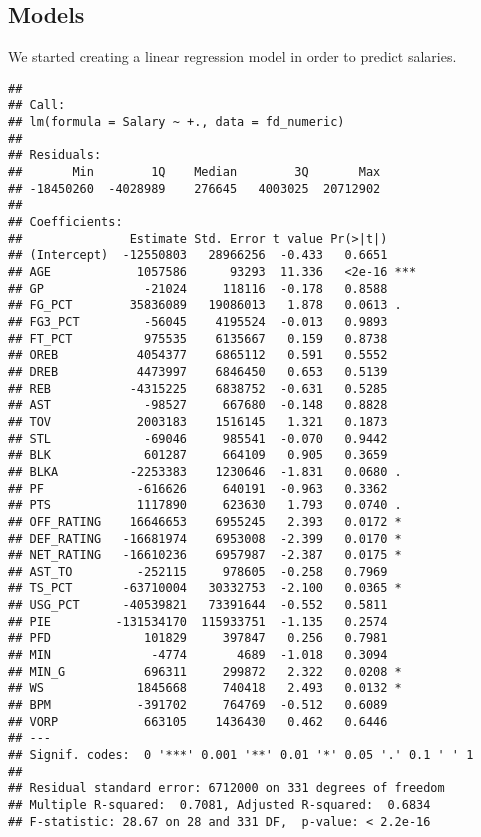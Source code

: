 \documentclass[
]{article}
\begin{document}
\hypertarget{models}{%
\subsection{Models}\label{models}}

We started creating a linear regression model in order to predict
salaries.

\begin{verbatim}
## 
## Call:
## lm(formula = Salary ~ +., data = fd_numeric)
## 
## Residuals:
##       Min        1Q    Median        3Q       Max 
## -18450260  -4028989    276645   4003025  20712902 
## 
## Coefficients:
##               Estimate Std. Error t value Pr(>|t|)    
## (Intercept)  -12550803   28966256  -0.433   0.6651    
## AGE            1057586      93293  11.336   <2e-16 ***
## GP              -21024     118116  -0.178   0.8588    
## FG_PCT        35836089   19086013   1.878   0.0613 .  
## FG3_PCT         -56045    4195524  -0.013   0.9893    
## FT_PCT          975535    6135667   0.159   0.8738    
## OREB           4054377    6865112   0.591   0.5552    
## DREB           4473997    6846450   0.653   0.5139    
## REB           -4315225    6838752  -0.631   0.5285    
## AST             -98527     667680  -0.148   0.8828    
## TOV            2003183    1516145   1.321   0.1873    
## STL             -69046     985541  -0.070   0.9442    
## BLK             601287     664109   0.905   0.3659    
## BLKA          -2253383    1230646  -1.831   0.0680 .  
## PF             -616626     640191  -0.963   0.3362    
## PTS            1117890     623630   1.793   0.0740 .  
## OFF_RATING    16646653    6955245   2.393   0.0172 *  
## DEF_RATING   -16681974    6953008  -2.399   0.0170 *  
## NET_RATING   -16610236    6957987  -2.387   0.0175 *  
## AST_TO         -252115     978605  -0.258   0.7969    
## TS_PCT       -63710004   30332753  -2.100   0.0365 *  
## USG_PCT      -40539821   73391644  -0.552   0.5811    
## PIE         -131534170  115933751  -1.135   0.2574    
## PFD             101829     397847   0.256   0.7981    
## MIN              -4774       4689  -1.018   0.3094    
## MIN_G           696311     299872   2.322   0.0208 *  
## WS             1845668     740418   2.493   0.0132 *  
## BPM            -391702     764769  -0.512   0.6089    
## VORP            663105    1436430   0.462   0.6446    
## ---
## Signif. codes:  0 '***' 0.001 '**' 0.01 '*' 0.05 '.' 0.1 ' ' 1
## 
## Residual standard error: 6712000 on 331 degrees of freedom
## Multiple R-squared:  0.7081, Adjusted R-squared:  0.6834 
## F-statistic: 28.67 on 28 and 331 DF,  p-value: < 2.2e-16
\end{verbatim}
\end{document}
